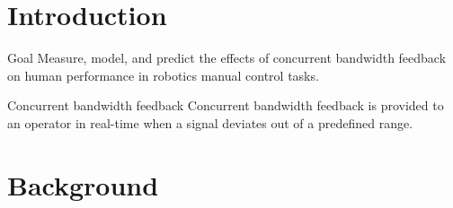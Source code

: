 \documentclass[10pt]{beamer}
\begin{document}
\section{Introduction}

{ %
    \begin{frame}[plain]
     \end{frame}
}

\begin{frame}[fragile]{Goal}
  Measure, model, and predict the effects of concurrent bandwidth feedback on human performance in robotics manual control tasks.
\end{frame}

\begin{frame}[fragile]{Concurrent bandwidth feedback}
  Concurrent bandwidth feedback is provided to an operator in real-time when a signal deviates out of a predefined range.
\end{frame}

\section{Background}
\end{document}
